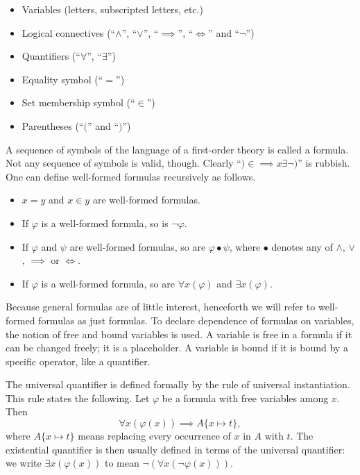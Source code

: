 \documentclass[../main.tex]{subfiles}
\begin{document}
\begin{itemize}
    \item Variables (letters, subscripted letters, etc.)
    \item Logical connectives (``$\land$'', ``$\lor$'', ``$\implies$'', ``$\iff$'' and ``$\lnot$'')
    \item Quantifiers (``$\forall$'', ``$\exists$'')
    \item Equality symbol (``$=$'')
    \item Set membership symbol (``$\in$'')
    \item Parentheses (``$($'' and ``$)$'')
\end{itemize}
A sequence of symbols of the language of a first-order theory is called a formula. Not any sequence of symbols is valid, though. Clearly ``$)\in\implies x\exists\lnot)$'' is rubbish. One can define well-formed formulas recursively as follows.
\begin{itemize}
    \item $x=y$ and $x\in y$ are well-formed formulas.
    \item If $\varphi$ is a well-formed formula, so is $\lnot\varphi$.
    \item If $\varphi$ and $\psi$ are well-formed formulas, so are $\varphi\mathrel{\bullet}\psi$, where $\bullet$ denotes any of $\land$, $\lor$, $\implies$ or $\iff$.
    \item If $\varphi$ is a well-formed formula, so are $\forall x(\varphi)$ and $\exists x(\varphi)$.
\end{itemize}
Because general formulas are of little interest, henceforth we will refer to well-formed formulas as just formulas. To declare dependence of formulas on variables, the notion of free and bound variables is used. A variable is free in a formula if it can be changed freely; it is a placeholder. A variable is bound if it is bound by a specific operator, like a quantifier.

The universal quantifier is defined formally by the rule of universal instantiation. This rule states the following. Let $\varphi$ be a formula with free variables among $x$. Then
\begin{equation*}
    \forall x(\varphi(x))\implies A\{x\mapsto t\},
\end{equation*}
where $A\{x\mapsto t\}$ means replacing every occurrence of $x$ in $A$ with $t$. The existential quantifier is then usually defined in terms of the universal quantifier: we write $\exists x(\varphi(x))$ to mean $\lnot(\forall x(\lnot\varphi(x)))$.
\end{document}
